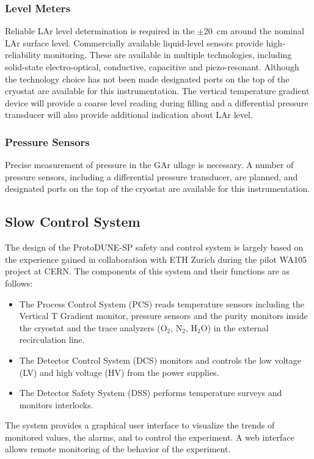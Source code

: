 \subsubsection{Level Meters}
	Reliable LAr level determination is required in the $\pm$20~cm around the nominal LAr surface level. Commercially available liquid-level sensors provide high-reliability monitoring. These are available in multiple technologies, %
	including solid-state electro-optical, %
	conductive, capacitive and piezo-resonant. Although the technology choice has not been made%
	designated ports on the top of the cryostat are available for this instrumentation.
The vertical temperature gradient device will provide a coarse level reading during filling and 
 a differential pressure transducer will also provide additional indication about LAr level.
 

\subsubsection{Pressure Sensors}
	Precise measurement of pressure in the GAr ullage is necessary. A number of pressure sensors, including a differential pressure transducer, are planned, %
	and designated ports on the top of the cryostat are available for this instrumentation.

\subsection{Slow Control System}

The design of the ProtoDUNE-SP safety and control system is largely based on the experience gained in collaboration with ETH Zurich during the pilot WA105 project at CERN. The components of this system and their functions are as follows:
\begin{itemize}
\item	The Process Control System (PCS) reads temperature sensors including the Vertical T Gradient monitor, pressure sensors and the purity monitors inside the cryostat and the trace analyzers (O$_2$, N$_2$, H$_2$O) in the external recirculation line.
\item	The Detector Control System (DCS) monitors and controls the low voltage (LV) and high voltage (HV) from the power supplies.
\item	The Detector Safety System (DSS) %
performs temperature surveys and monitors interlocks.
\end{itemize}
The system provides a graphical user interface to visualize the trends of monitored values, the alarms, and to control the  experiment. A web interface allows remote monitoring of the behavior of the experiment. 

